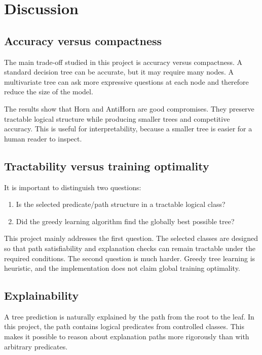 \documentclass[11pt,a4paper]{article}
\begin{document}
\section{Discussion}

\subsection{Accuracy versus compactness}

The main trade-off studied in this project is accuracy versus compactness. A standard decision tree can be accurate, but it may require many nodes. A multivariate tree can ask more expressive questions at each node and therefore reduce the size of the model.

The results show that Horn and AntiHorn are good compromises. They preserve tractable logical structure while producing smaller trees and competitive accuracy. This is useful for interpretability, because a smaller tree is easier for a human reader to inspect.

\subsection{Tractability versus training optimality}

It is important to distinguish two questions:
\begin{enumerate}
    \item Is the selected predicate/path structure in a tractable logical class?
    \item Did the greedy learning algorithm find the globally best possible tree?
\end{enumerate}

This project mainly addresses the first question. The selected classes are designed so that path satisfiability and explanation checks can remain tractable under the required conditions. The second question is much harder. Greedy tree learning is heuristic, and the implementation does not claim global training optimality.

\subsection{Explainability}

A tree prediction is naturally explained by the path from the root to the leaf. In this project, the path contains logical predicates from controlled classes. This makes it possible to reason about explanation paths more rigorously than with arbitrary predicates.
\end{document}
